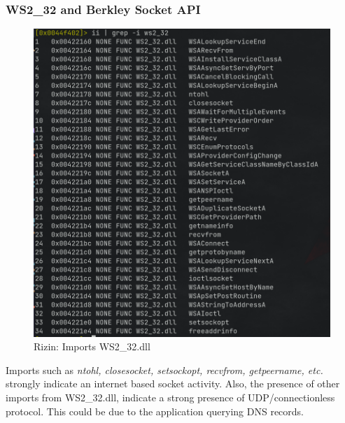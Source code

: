 \documentclass[10pt,a4paper]{article}
\begin{document}
	\subsubsection{WS2\_32 and Berkley Socket API}
		\begin{figure}[!htbp]%
			\centering
			\includegraphics[width=\columnwidth]{pics/ws2_32.png}
			\caption{Rizin: Imports WS2\_32.dll}
			\label{ws2_32}
		\end{figure}
		Imports such as \textit{ntohl, closesocket, setsockopt, recvfrom, getpeername, etc.} strongly indicate
		an internet based socket activity.
		Also, the presence of other imports from WS2\_32.dll, indicate a strong presence of UDP/connectionless protocol.
		This could be due to the application querying DNS records.
\end{document}
